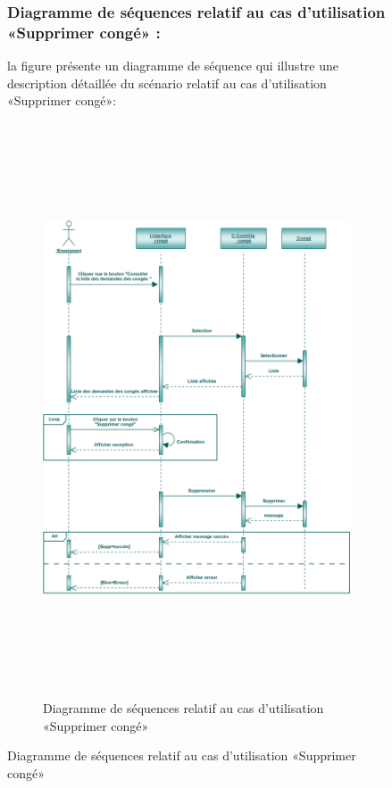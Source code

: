 \documentclass[12 pt]{report}
\begin{document}
\begin{figure}[h]
\begin{center}
\subsubsection{Diagramme de séquences relatif au cas d’utilisation «Supprimer  congé» :}
la figure   présente un diagramme de séquence qui illustre une description détaillée du scénario relatif au cas d’utilisation «Supprimer congé»: 
\begin{figure}[h]
 \begin{center}
\includegraphics[width= 18 cm ,height=  17cm]{ssc.PNG}
\caption{Diagramme de séquences relatif au cas d’utilisation «Supprimer congé»}

\end{center}
\end{figure}

\end{center}
\end{figure}
\end{document}
